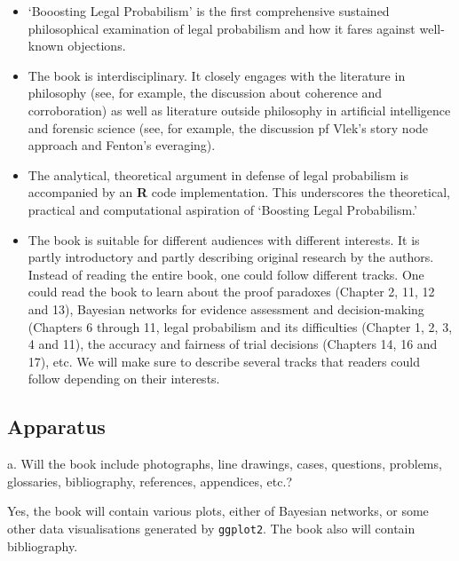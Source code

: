 \documentclass[
  10pt,
  dvipsnames,enabledeprecatedfontcommands]{scrartcl}
\begin{document}
\begin{itemize}
\item
  `Booosting Legal Probabilism' is the first comprehensive sustained
  philosophical examination of legal probabilism and how it fares
  against well-known objections.
\item
  The book is interdisciplinary. It closely engages with the literature
  in philosophy (see, for example, the discussion about coherence and
  corroboration) as well as literature outside philosophy in artificial
  intelligence and forensic science (see, for example, the discussion pf
  Vlek's story node approach and Fenton's everaging).
\item
  The analytical, theoretical argument in defense of legal probabilism
  is accompanied by an \textbf{\textsf{R}} code implementation. This
  underscores the theoretical, practical and computational aspiration of
  `Boosting Legal Probabilism.'
\item
  The book is suitable for different audiences with different interests.
  It is partly introductory and partly describing original research by
  the authors. Instead of reading the entire book, one could follow
  different tracks. One could read the book to learn about the proof
  paradoxes (Chapter 2, 11, 12 and 13), Bayesian networks for evidence
  assessment and decision-making (Chapters 6 through 11, legal
  probabilism and its difficulties (Chapter 1, 2, 3, 4 and 11), the
  accuracy and fairness of trial decisions (Chapters 14, 16 and 17),
  etc. We will make sure to describe several tracks that readers could
  follow depending on their interests.
\end{itemize}


\hypertarget{apparatus}{%
\subsection{Apparatus}\label{apparatus}}

\footnotesize a. Will the book include photographs, line drawings,
cases, questions, problems, glossaries, bibliography, references,
appendices, etc.?

\vspace{2mm}

\normalsize

Yes, the book will contain various plots, either of Bayesian networks,
or some other data visualisations generated by \texttt{ggplot2}. The
book also will contain bibliography. \vspace{2mm}
\end{document}
